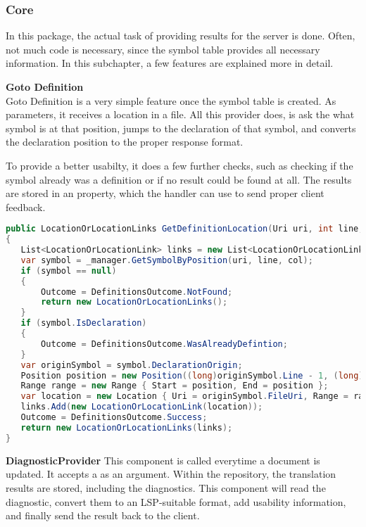 \subsubsection{Core}
In this package, the actual task of providing results for the server is done. Often, not much code is necessary, since the symbol table provides all necessary information. In this subchapter, a few features are explained more in detail.

\textbf{Goto Definition}\\
Goto Definition is a very simple feature once the symbol table is created. As parameters, it receives a location in a file. All this provider does, is ask the  what symbol is at that position, jumps to the declaration of that symbol, and converts the declaration position to the proper response format.

To provide a better usabilty, it does a few further checks, such as checking if the symbol already was a definition or if no result could be found at all. The results are stored in an  property, which the handler can use to send proper client feedback.

\begin{lstlisting}[language=csharp, caption={Providing Goto Definition}, captionpos=b, label={lst:gotoCore}]
public LocationOrLocationLinks GetDefinitionLocation(Uri uri, int line, int col)
{
   List<LocationOrLocationLink> links = new List<LocationOrLocationLink>();
   var symbol = _manager.GetSymbolByPosition(uri, line, col);
   if (symbol == null)
   {
       Outcome = DefinitionsOutcome.NotFound;
       return new LocationOrLocationLinks();
   }
   if (symbol.IsDeclaration)
   {
       Outcome = DefinitionsOutcome.WasAlreadyDefintion;
   }
   var originSymbol = symbol.DeclarationOrigin;
   Position position = new Position((long)originSymbol.Line - 1, (long)originSymbol.ColumnStart - 1);
   Range range = new Range { Start = position, End = position };
   var location = new Location { Uri = originSymbol.FileUri, Range = range };
   links.Add(new LocationOrLocationLink(location));
   Outcome = DefinitionsOutcome.Success;
   return new LocationOrLocationLinks(links);
}
\end{lstlisting}

\textbf{DiagnosticProvider}
This component is called everytime a document is updated. It accepts a  as an argument. Within the repository, the translation results are stored, including the diagnostics. This component will read the diagnostic, convert them to an LSP-suitable format, add usability information, and finally send the result back to the client.

